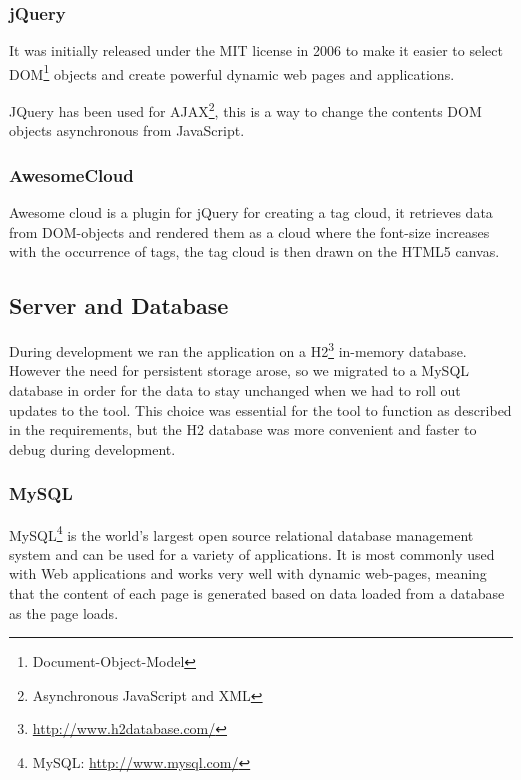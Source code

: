 \subsubsection{jQuery}
It was initially released under the MIT license in 2006 to make it easier to select DOM\footnote{Document-Object-Model} objects and create powerful dynamic web pages and applications.

JQuery has been used for AJAX\footnote{Asynchronous JavaScript and XML}, this is a way to change the contents DOM objects asynchronous from JavaScript.

\subsubsection{AwesomeCloud}
Awesome cloud is a plugin for jQuery for creating a tag cloud, it retrieves data from DOM-objects and rendered them as a cloud where the font-size increases with the occurrence of tags, the tag cloud is then drawn on the HTML5 canvas.

\subsection{Server and Database}
\label{sec:database}
During development we ran the application on a H2\footnote{\url{http://www.h2database.com/}} in-memory database. However the need for persistent storage arose, so we migrated to a MySQL database in order for the data to stay unchanged when we had to roll out updates to the tool. This choice was essential for the tool to function as described in the requirements, but the H2 database was more convenient and faster to debug during development.
\subsubsection{MySQL}
MySQL\footnote{MySQL: \url{http://www.mysql.com/}} is the world's largest open source relational database management system and can be used for a variety of applications. It is most commonly used with Web applications and works very well with dynamic web-pages, meaning that the content of each page is generated based on data loaded from a database as the page loads.

